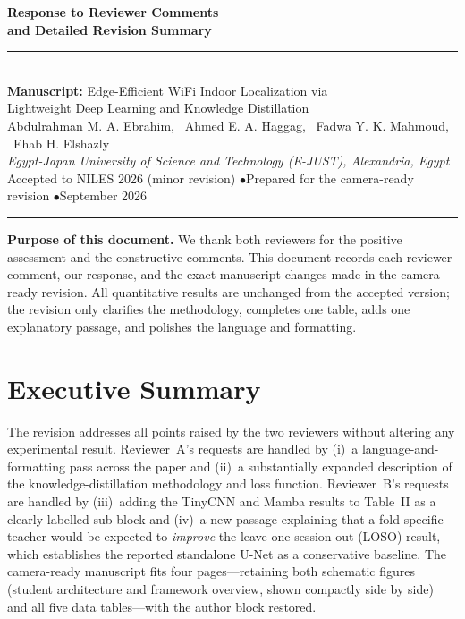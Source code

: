 \documentclass[11pt]{article}
\begin{document}
\begin{center}
{\LARGE\bfseries\color{ejblue} Response to Reviewer Comments}\\[2pt]
{\large\bfseries and Detailed Revision Summary}\\[10pt]
\rule{\textwidth}{0.8pt}\\[8pt]
{\large\textbf{Manuscript:} Edge-Efficient WiFi Indoor Localization via\\ Lightweight Deep Learning and Knowledge Distillation}\\[8pt]
{\normalsize Abdulrahman M. A. Ebrahim, \ Ahmed E. A. Haggag, \ Fadwa Y. K. Mahmoud, \ Ehab H. Elshazly}\\[3pt]
{\small\itshape Egypt-Japan University of Science and Technology (E-JUST), Alexandria, Egypt}\\[8pt]
{\normalsize Accepted to NILES 2026 (minor revision) \quad$\bullet$\quad Prepared for the camera-ready revision \quad$\bullet$\quad September 2026}\\[6pt]
\rule{\textwidth}{0.8pt}
\end{center}

\textbf{Purpose of this document.} We thank both reviewers for the positive assessment and the constructive comments. This document records each reviewer comment, our response, and the exact manuscript changes made in the camera-ready revision. All quantitative results are unchanged from the accepted version; the revision only clarifies the methodology, completes one table, adds one explanatory passage, and polishes the language and formatting.

\section{Executive Summary}
The revision addresses all points raised by the two reviewers without altering any experimental result. Reviewer~A's requests are handled by (i)~a language-and-formatting pass across the paper and (ii)~a substantially expanded description of the knowledge-distillation methodology and loss function. Reviewer~B's requests are handled by (iii)~adding the TinyCNN and Mamba results to Table~II as a clearly labelled sub-block and (iv)~a new passage explaining that a fold-specific teacher would be expected to \emph{improve} the leave-one-session-out (LOSO) result, which establishes the reported standalone U-Net as a conservative baseline. The camera-ready manuscript fits four pages---retaining both schematic figures (student architecture and framework overview, shown compactly side by side) and all five data tables---with the author block restored.
\end{document}
